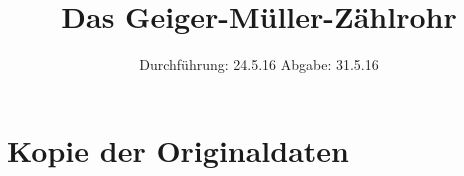 

\subject{V 703}
\title{Das Geiger-Müller-Zählrohr}
\date{
  Durchführung: 24.5.16
  \hspace{3em}
  Abgabe: 31.5.16
}



\maketitle
\thispagestyle{empty}
\tableofcontents
\newpage






\printbibliography

\appendix
\section{Kopie der Originaldaten}


